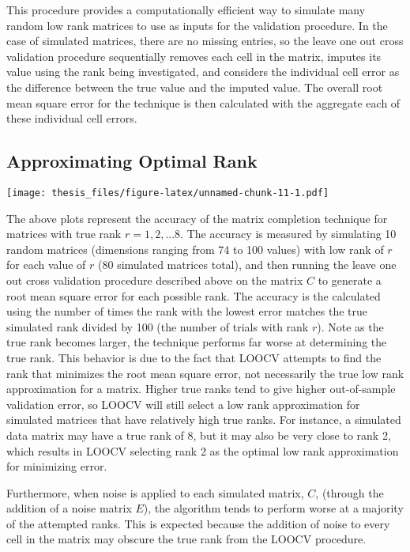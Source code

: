 \documentclass[12pt,twoside]{dukestatscithesis}
\theoremstyle{definition}
\theoremstyle{definition}
\theoremstyle{definition}
\theoremstyle{remark}
\begin{document}
This procedure provides a computationally efficient way to simulate many
random low rank matrices to use as inputs for the validation procedure.
In the case of simulated matrices, there are no missing entries, so the
leave one out cross validation procedure sequentially removes each cell
in the matrix, imputes its value using the rank being investigated, and
considers the individual cell error as the difference between the true
value and the imputed value. The overall root mean square error for the
technique is then calculated with the aggregate each of these individual
cell errors.

\subsection{Approximating Optimal
Rank}\label{approximating-optimal-rank}

\texttt{[image: thesis\_files/figure-latex/unnamed-chunk-11-1.pdf]}

The above plots represent the accuracy of the matrix completion
technique for matrices with true rank \(r = 1,2,...8\). The accuracy is
measured by simulating 10 random matrices (dimensions ranging from 74 to
100 values) with low rank of \(r\) for each value of \(r\) (80 simulated
matrices total), and then running the leave one out cross validation
procedure described above on the matrix \(C\) to generate a root mean
square error for each possible rank. The accuracy is the calculated
using the number of times the rank with the lowest error matches the
true simulated rank divided by 100 (the number of trials with rank
\(r\)). Note as the true rank becomes larger, the technique performs far
worse at determining the true rank. This behavior is due to the fact
that LOOCV attempts to find the rank that minimizes the root mean square
error, not necessarily the true low rank approximation for a matrix.
Higher true ranks tend to give higher out-of-sample validation error, so
LOOCV will still select a low rank approximation for simulated matrices
that have relatively high true ranks. For instance, a simulated data
matrix may have a true rank of 8, but it may also be very close to rank
2, which results in LOOCV selecting rank 2 as the optimal low rank
approximation for minimizing error.

Furthermore, when noise is applied to each simulated matrix, \(C\),
(through the addition of a noise matrix \(E\)), the algorithm tends to
perform worse at a majority of the attempted ranks. This is expected
because the addition of noise to every cell in the matrix may obscure
the true rank from the LOOCV procedure.
\end{document}
